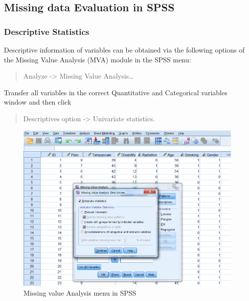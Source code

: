 \documentclass[]{book}
\theoremstyle{definition}
\theoremstyle{definition}
\theoremstyle{definition}
\theoremstyle{remark}
\begin{document}
\subsection{Missing data Evaluation in
SPSS}\label{missing-data-evaluation-in-spss}

\subsubsection{Descriptive Statistics}\label{descriptive-statistics}

Descriptive information of variables can be obtained via the following
options of the Missing Value Analysis (MVA) module in the SPSS menu:

\begin{quote}
Analyze -\textgreater{} Missing Value Analysis\ldots{}
\end{quote}

Transfer all variables in the correct Quantitative and Categorical
variables window and then click

\begin{quote}
Descriptives option -\textgreater{} Univariate statistics.
\end{quote}

\begin{figure}

{\centering \includegraphics[width=0.9\linewidth]{images/fig2.10} 

}

\caption{Missing value Analysis menu in SPSS}\label{fig:fig2-10}
\end{figure}
\end{document}
